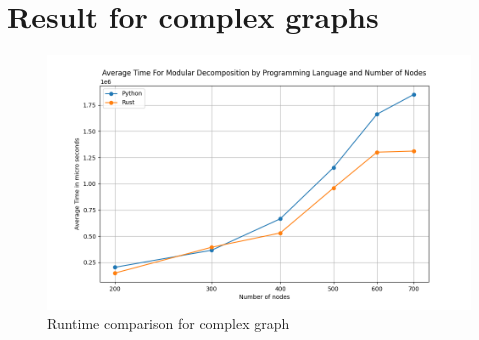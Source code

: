 \section{Result for complex graphs}\label{sec:result-for-complex-graphs}

\begin{figure}[!h]
    \centering
    \includegraphics[width=1\textwidth]{images/stats/md_complex}
    \caption{Runtime comparison for complex graph}
    \label{fig:runtime-comparison-for-complex-graph}
\end{figure}


